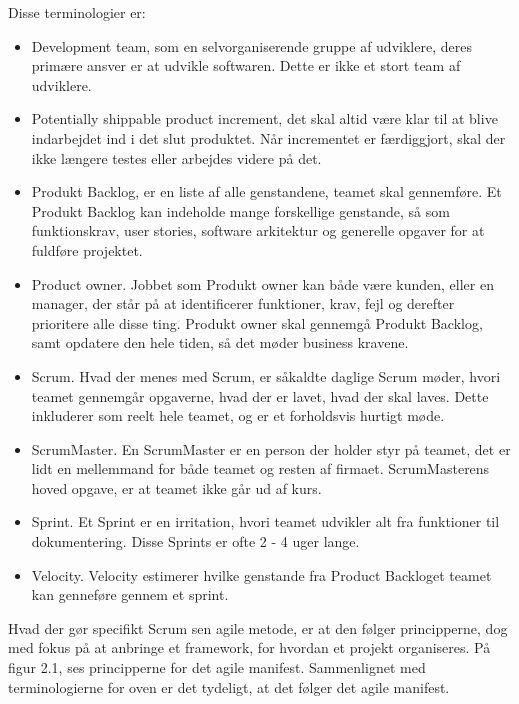 Disse terminologier er:  
\begin{itemize}
    \item Development team, som en selvorganiserende gruppe af udviklere, deres primære ansver er at udvikle softwaren. Dette er ikke et stort team af udviklere. 
    
    \item Potentially shippable product increment, det skal altid være klar til at blive indarbejdet ind i det slut produktet. Når incrementet er færdiggjort, skal der ikke længere testes eller arbejdes videre på det.
    
    \item Produkt Backlog, er en liste af alle genstandene, teamet skal gennemføre. Et Produkt Backlog kan indeholde mange forskellige genstande, så som funktionskrav, user stories, software arkitektur og generelle opgaver for at fuldføre projektet. 

    
    \item Product owner. Jobbet som Produkt owner kan både være kunden, eller en manager, der står på at identificerer funktioner, krav, fejl og derefter prioritere alle disse ting. Produkt owner skal gennemgå Produkt Backlog, samt opdatere den hele tiden, så det møder business kravene. 
    
    \item Scrum. Hvad der menes med Scrum, er såkaldte daglige Scrum møder, hvori teamet gennemgår opgaverne, hvad der er lavet, hvad der skal laves. Dette inkluderer som reelt hele teamet, og er et forholdsvis hurtigt møde. 
    
    \item ScrumMaster. En ScrumMaster er en person der holder styr på teamet, det er lidt en mellemmand for både teamet og resten af firmaet. ScrumMasterens hoved opgave, er at teamet ikke går ud af kurs. 
    
    \item Sprint. Et Sprint er en irritation, hvori teamet udvikler alt fra funktioner til dokumentering. Disse Sprints er ofte 2 - 4 uger lange. 
    
    \item Velocity. Velocity estimerer hvilke genstande fra Product Backloget teamet kan genneføre gennem et sprint.
\end{itemize}

Hvad der gør specifikt Scrum sen agile metode, er at den følger principperne, dog med fokus på at anbringe et framework, for hvordan et projekt organiseres. På figur 2.1, ses principperne for det agile manifest. Sammenlignet med terminologierne for oven er det tydeligt, at det følger det agile manifest. \cite{Sommerville} 
 

